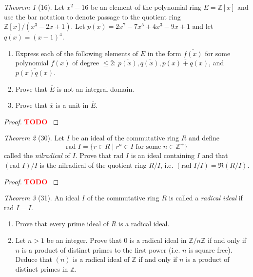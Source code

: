\documentclass[12pt]{article}
\theoremstyle{remark}
\theoremstyle{named}
\newtheorem*{theorem}{Theorem}
\newcommand{\todo}{\textcolor{red}{\textbf{TODO} }}
\newcommand{\Z}{\mathbb Z}
\newcommand{\rad}{\text{rad }}
\begin{document}
\begin{theorem}[16]
    Let \(x^2 - 16\) be an element of the polynomial ring \(E = \Z[x]\) and use the bar notation to denote passage to the quotient ring \(\Z[x]/(x^3 - 2x + 1)\). Let \(p(x) = 2x^7 - 7x^5 + 4x^3 - 9x + 1\) and let \(q(x) = (x - 1)^4\).
    \begin{enumerate}
        \item Express each of the following elements of \(\overline{E}\) in the form \(\overline{f(x)}\) for some polynomial \(f(x)\) of degree \(\le 2\): \(\overline{p(x)}, \overline{q(x)}, \overline{p(x) + q(x)}\), and \(\overline{p(x)q(x)}\).
        \item Prove that \(\overline{E}\) is not an integral domain.
        \item Prove that \(\overline{x}\) is a unit in \(\overline{E}\).
    \end{enumerate}
\end{theorem}

\begin{proof}
    \todo
\end{proof}

\begin{theorem}[30]
    Let \(I\) be an ideal of the commutative ring \(R\) and define 
    \[\rad I = \{r \in R \mid r^n \in I \text{ for some } n \in \Z^+\}\]
    called the \textit{nilradical} of \(I\). Prove that \(\rad I\) is an ideal containing \(I\) and that \((\rad I)/I\) is the nilradical of the quotient ring \(R / I\), i.e. \((\rad I / I) = \mathfrak{R}(R / I)\).
\end{theorem}

\begin{proof}
    \todo
\end{proof}

\begin{theorem}[31]
    An ideal \(I\) of the commutative ring \(R\) is called a \textit{radical ideal} if \(\rad I = I\). 
    \begin{enumerate}
        \item Prove that every prime ideal of \(R\) is a radical ideal.
        \item Let \(n > 1\) be an integer. Prove that 0 is a radical ideal in \(\Z / n \Z\) if and only if \(n\) is a product of distinct primes to the first power (i.e. \(n\) is square free). Deduce that \((n)\) is a radical ideal of \(\Z\) if and only if \(n\) is a product of distinct primes in \(\Z\). 
    \end{enumerate}
\end{theorem}
\end{document}
